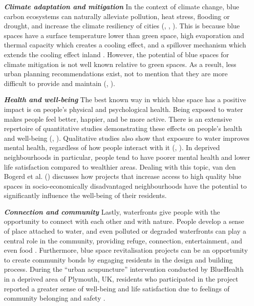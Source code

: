 \documentclass{article}
\newcommand{\bisection}[1]{\textbf{\textit{#1}}}
\begin{document}
\bisection{Climate adaptation and mitigation}
In the context of climate change, blue carbon ecosystems can naturally alleviate pollution, heat stress, flooding or drought, and increase the climate resiliency of cities (\cite{lin2020water}, \cite{manteghi2015water}, \cite{o2021international}). 
This is because blue spaces have a surface temperature lower than green space, high evaporation and thermal capacity which creates a cooling effect, and a spillover mechanism which extends the cooling effect inland \parencite{lin2020water}.
However, the potential of blue spaces for climate mitigation is not well known relative to green spaces. As a result, less urban planning recommendations exist, not to mention that they are more difficult to provide and maintain (\cite{manteghi2015water}, \cite{volker2013evidence}).

\bisection{Health and well-being}
The best known way in which blue space has a positive impact is on people's physical and psychological health. Being exposed to water makes people feel better, happier, and be more active. 
There is an extensive repertoire of quantitative studies demonstrating these effects on people's health and well-being (\cite{gascon2017outdoor}, \cite{britton2020blue}).
Qualitative studies also show that exposure to water improves mental health, regardless of how people interact with it (\cite{garrett2019urban}, \cite{van2021urban}).
In deprived neighbourhoods in particular, people tend to have poorer mental health and lower life satisfaction compared to wealthier areas. Dealing with this topic, van den Bogerd et al. (\citeyear{van2021urban}) discusses how projects that increase access to high quality blue spaces in socio-economically disadvantaged neighbourhoods have the potential to significantly influence the well-being of their residents.

\bisection{Connection and community}
Lastly, waterfronts give people with the opportunity to connect with each other and with nature. People develop a sense of place attached to water, and even polluted or degraded waterfronts can play a central role in the community, providing refuge, connection, entertainment, and even food \parencite{toomey2021place}. 
Furthermore, blue space revitalisation projects can be an opportunity to create community bonds by engaging residents in the design and building process. During the ``urban acupuncture'' intervention conducted by BlueHealth in a deprived area of Plymouth, UK, residents who participated in the project reported a greater sense of well-being and life satisfaction due to feelings of community belonging and safety \parencite{van2021urban}.
\end{document}
